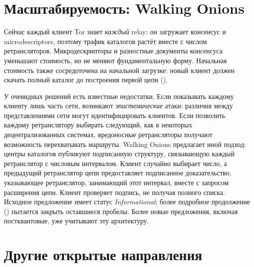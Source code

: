 \section{Масштабируемость: Walking Onions}\label{sec:fut-walking}

Сейчас каждый клиент Tor знает \emph{каждый} relay: он загружает консенсус и microdescriptors, поэтому трафик каталогов растёт вместе с числом ретрансляторов. Микродескрипторы и разностные документы консенсуса уменьшают стоимость, но не меняют фундаментальную форму. Начальная стоимость также сосредоточена на начальной загрузке: новый клиент должен скачать полный каталог до построения первой цепи ().

У очевидных решений есть известные недостатки. Если показывать каждому клиенту лишь часть сети, возникают \emph{эпистемические} атаки: различия между представлениями сети могут идентифицировать клиентов. Если позволить каждому ретранслятору выбирать следующий, как в некоторых децентрализованных системах, вредоносные ретрансляторы получают возможность перехватывать маршруты. Walking Onions предлагает иной подход: центры каталогов публикуют подписанную структуру, связывающую каждый ретранслятор с числовым интервалом. Клиент случайно выбирает число, а предыдущий ретранслятор цепи предоставляет подписанное доказательство, указывающее ретранслятор, занимающий этот интервал, вместе с запросом расширения цепи. Клиент проверяет подпись, не получая полного списка. Исходное предложение имеет статус \emph{Informational}; более подробное продолжение () пытается закрыть оставшиеся пробелы. Более новые предложения, включая постквантовые, уже учитывают эту архитектуру.

\section{Другие открытые направления}\label{sec:fut-altri}

